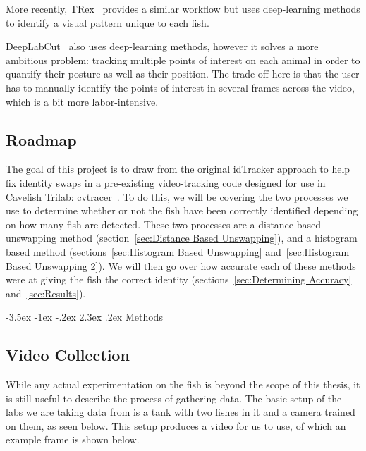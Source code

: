 \documentclass{article}
\makeatletter
\renewcommand\section{\clearpage\newpage\@startsection {section}{1}{\z@}%
	{-3.5ex \@plus -1ex \@minus -.2ex}%
	{2.3ex \@plus.2ex}%
	{\normalfont\Large\bfseries}}
\makeatother
\begin{document}
More recently, TRex~\cite{walter_trex_2021} provides a similar workflow but uses deep-learning methods to identify a visual pattern unique to each fish.

DeepLabCut~\cite{mathis_deeplabcut_2018} also uses deep-learning methods, however it solves a more ambitious problem: tracking multiple points of interest on each animal in order to quantify their posture as well as their position. The trade-off here is that the user has to manually identify the points of interest in several frames across the video, which is a bit more labor-intensive.

\subsection{Roadmap}

The goal of this project is to draw from the original idTracker approach to help fix identity swaps in a pre-existing video-tracking code designed for use in Cavefish Trilab: cvtracer~\cite{patch_kinematic_2020, patch_patchmemorycvtracer_2020}. To do this, we will be covering the two processes we use to determine whether or not the fish have been correctly identified depending on how many fish are detected. These two processes are a distance based unswapping method (section~\ref{sec:Distance Based Unswapping}), and a histogram based method (sections~\ref{sec:Histogram Based Unswapping} and~\ref{sec:Histogram Based Unswapping 2}). We will then go over how accurate each of these methods were at giving the fish the correct identity (sections~\ref{sec:Determining Accuracy} and~\ref{sec:Results}).

\section{Methods}

\subsection{Video Collection}
While any actual experimentation on the fish is beyond the scope of this thesis, it is still useful to describe the process of gathering data. The basic setup of the labs we are taking data from is a tank with two fishes in it and a camera trained on them, as seen below. 
This setup produces a video for us to use, of which an example frame is shown below.
\end{document}
